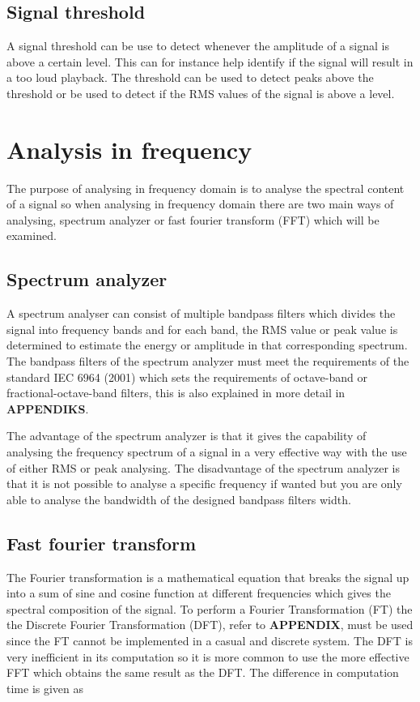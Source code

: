 \subsection*{Signal threshold}
A signal threshold can be use to detect whenever the amplitude of a signal is above a certain level. This can for instance help identify if the signal will result in a too loud playback. The threshold can be used to detect peaks above the threshold or be used to detect if the RMS values of the signal is above a level.

\section{Analysis in frequency} \label{sec:SignalFreq}
The purpose of analysing in frequency domain is to analyse the spectral content of a signal so when analysing in frequency domain there are two main ways of analysing, spectrum analyzer or fast fourier transform (FFT) which will be examined.

\subsection*{Spectrum analyzer}
A spectrum analyser can consist of multiple bandpass filters which divides the signal into frequency bands and for each band, the RMS value or peak value is determined to estimate the energy or amplitude in that corresponding spectrum. The bandpass filters of the spectrum analyzer must meet the requirements of the standard IEC 6964 (2001) which sets the requirements of octave-band or fractional-octave-band filters, this is also explained in more detail in \textbf{APPENDIKS}.  

The advantage of the spectrum analyzer is that it gives the capability of analysing the frequency spectrum of a signal in a very effective way with the use of either RMS or peak analysing. The disadvantage of the spectrum analyzer is that it is not possible to analyse a specific frequency if wanted but you are only able to analyse the bandwidth of the designed bandpass filters width.      


\subsection*{Fast fourier transform}

The Fourier transformation is a mathematical equation that breaks the signal up into a sum of sine and cosine function at different frequencies which gives the spectral composition of the signal. To perform a Fourier Transformation (FT) the the Discrete Fourier Transformation (DFT), refer to \textbf{APPENDIX}, must be used since the FT cannot be implemented in a casual and discrete system. The DFT is very inefficient in its computation so it is more common to use the more effective FFT which obtains the same result as the DFT. The difference in computation time is given as

